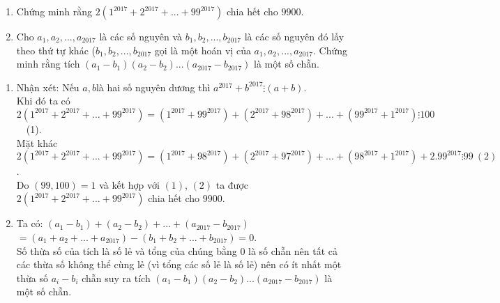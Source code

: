 \begin{ex}%
\hfill

    \begin{enumerate}
    \item  Chứng minh rằng $2(1^{2017}+2^{2017}+...+99^{2017})$ chia hết cho $9900$.
   \item  Cho $a_1,a_2,...,a_{2017}$ là các số nguyên và $b_1,b_2,...,b_{2017}$ là các số nguyên đó lấy theo thứ tự khác ($b_1,b_2,...,b_{2017}$ gọi là một hoán vị của $a_1,a_2,...,a_{2017}$. Chứng minh rằng tích $(a_1-b_1)(a_2-b_2)...(a_{2017}-b_{2017})$ là một số chẵn.
    \end{enumerate}
\loigiai
    {
    \begin{enumerate}
   \item   Nhận xét: Nếu $a,b$là hai số nguyên dương thì $a^{2017}+b^{2017}\vdots (a+b)$.\\
 Khi đó ta có\\
$2( 1^{2017}+2^{2017}+...+99^{2017})=(1^{2017}+99^{2017})+( 2^{2017}+98^{2017})+...+( 99^{2017}+1^{2017})\vdots 100$~~(1).\\
Mặt khác
$2(1^{2017}+2^{2017}+...+99^{2017})=(1^{2017}+98^{2017})+( 2^{2017}+97^{2017})+...+(98^{2017}+1^{2017})+2.99^{2017}\vdots 99~( 2)$.\\
Do $(99,100)=1$ và kết hợp với $(1)$, $(2)$ ta được $2( 1^{2017}+2^{2017}+...+99^{2017})$ chia hết cho $9900$.
\item Ta có: $( a_1-b_1)+( a_2-b_2)+...+(a_{2017}-b_{2017})$\\
$=(a_1+a_2+...+a_{2017})-(b_1+b_2+...+b_{2017})=0$.\\
Số thừa số của tích là số lẻ và tổng của chúng bằng $0$ là số chẵn nên tất cả các thừa số không thể cùng lẻ (vì tổng các số lẻ là số lẻ) nên có ít nhất một thừa số $a_i-b_i$ chẵn suy ra tích $( a_1-b_1)(a_2-b_2)...( a_{2017}-b_{2017})$ là một số chẵn.

    \end{enumerate}
    }
\end{ex}

